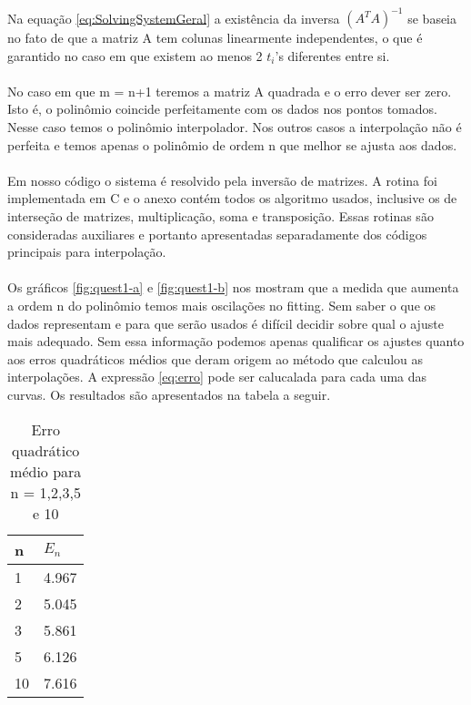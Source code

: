 \paragraph{}Na equação \ref{eq:SolvingSystemGeral} a existência da inversa 
$(A^T A)^{-1}$ se baseia no fato de que a matriz A tem colunas linearmente
independentes, o que é garantido no caso em que existem ao menos 2 $t_i$'s 
diferentes entre si.

\paragraph{} No caso em que m = n+1 teremos a matriz A quadrada e o
erro dever ser zero. Isto é, o polinômio coincide perfeitamente com os dados
nos pontos tomados. Nesse caso temos o polinômio interpolador. Nos outros casos
a interpolação não é perfeita e temos apenas o polinômio de ordem n que melhor
se ajusta aos dados.

\paragraph{}Em nosso código o sistema é resolvido pela inversão de matrizes. 
A rotina foi implementada em C e o anexo contém todos os algoritmo usados,
inclusive os de interseção de matrizes,  multiplicação, soma e transposição.
Essas rotinas são consideradas auxiliares e portanto apresentadas separadamente
dos códigos principais para interpolação. 

\paragraph{}Os gráficos \ref{fig:quest1-a} e \ref{fig:quest1-b} nos mostram
 que a medida que aumenta a ordem n
do polinômio temos mais oscilações no fitting. Sem saber o que os dados
representam e para que serão usados é difícil decidir sobre qual o ajuste
mais adequado. Sem essa informação podemos apenas qualificar os ajustes quanto
aos erros quadráticos médios que deram origem ao método que
calculou as interpolações. A expressão \ref{eq:erro} pode ser 
calucalada para cada uma das curvas. Os resultados são apresentados na tabela
a seguir.

\begin{table}[!htp]
\centering
	\begin{tabular}{|l|l|}\hline
	n & $E_{n}$ \\ \hline
	 1	& 4.967 \\ \hline	
	 2	& 5.045\\ \hline	
	 3	& 5.861\\ \hline	
	 5	& 6.126\\ \hline	
	10	& 7.616\\ \hline	
	\end{tabular}
	\caption{Erro quadrático médio para n = 1,2,3,5 e 10}
	\label{tab:ERMS-quest1}
\end{table}

